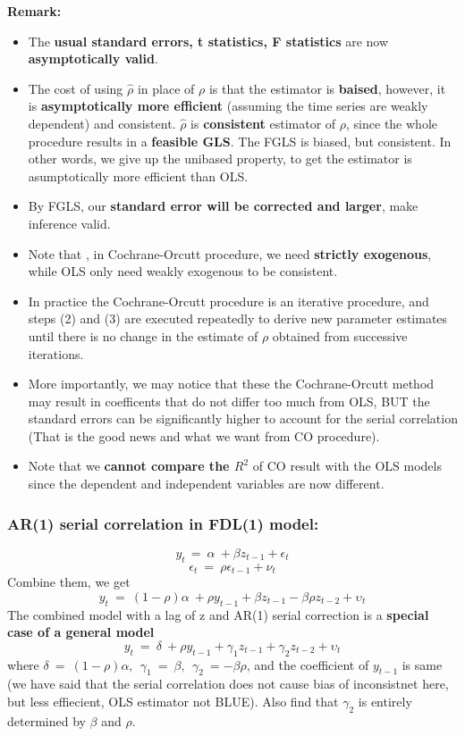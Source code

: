 \documentclass[12pt]{article}
\begin{document}
\noindent
{\color{ForestGreen}\textbf{Remark: }} 
\begin{itemize}
\item 
The \textbf{usual standard errors, t statistics, F statistics} are now \textbf{asymptotically valid}.
\item
The cost of using $\hat{\rho}$ in place of $\rho$ is that the estimator is \textbf{baised}, however, it is \textbf{asymptotically more efficient} (assuming the time series are weakly dependent) and consistent. $\hat{\rho}$ is \textbf{consistent} estimator of $\rho$, since the whole procedure results in a \textbf{feasible GLS}. The FGLS is biased, but consistent. In other words, we give up the unibased property, to get the estimator is asumptotically more efficient than OLS. 
\item
By FGLS, our \textbf{standard error will be corrected and larger}, make inference valid.
\item
Note that , in Cochrane-Orcutt procedure, we need \textbf{strictly exogenous}, while OLS only need weakly exogenous to be consistent.  
\item
In practice the Cochrane-Orcutt procedure is an iterative procedure, and steps (2) and (3) are executed repeatedly to derive new parameter estimates until there is no change in the estimate of $\rho$ obtained from successive iterations.
\item
More importantly, we may notice that these the Cochrane-Orcutt method may result in coefficents that do not differ too much from OLS, BUT the standard errors can be significantly higher to account for the serial correlation (That is the good news and what we want from CO procedure).
\item
Note that we \textbf{cannot compare the $R^2$} of CO result with the OLS models since the dependent and independent variables are now different.
\end{itemize}


\noindent
{\color{RoyalBlue}
\subsubsection{AR(1) serial correlation in FDL(1) model:}}
$$y_{t\ }=\ \alpha\ +\beta z_{t-1}+\epsilon_t$$
$$\epsilon_t\ =\ \rho\epsilon_{t-1}+\nu_t$$
Combine them, we get
$$y_t\ =\ \left(1-\rho\right)\alpha\ +\rho y_{t-1}+\beta z_{t-1}-\beta\rho z_{t-2}+\upsilon_t$$
The combined model with a lag of z and AR(1) serial correction is a \textbf{special case of a general model}
$$y_t\ =\ \delta\ +\rho y_{t-1}+\gamma_1z_{t-1}+\gamma_2z_{t-2}+\upsilon_t$$
where $\delta \ =\ \left(1-\rho \right)\alpha ,\ \ \gamma _1\ =\ \beta ,\ \ \gamma _2\ =-\beta \rho $, and the coefficient of $y_{t-1}$ is same (we have said that the serial correlation does not cause bias of inconsistnet here, but less effiecient, OLS estimator not BLUE). Also find that $\gamma _2$ is entirely determined by $\beta$ and $\rho$. 
\\
\end{document}
